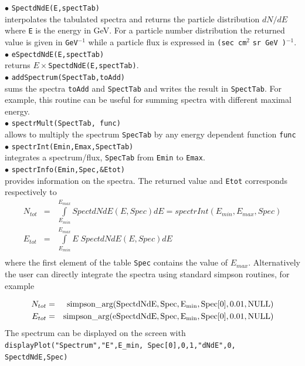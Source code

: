 \documentclass[12pt,a4paper]{article}
\begin{document}
\noindent
$\bullet$  \verb|SpectdNdE(E,spectTab)|\\
interpolates the tabulated spectra  and returns the 
particle distribution $dN/dE$  where \verb|E| is the energy  in GeV. 
For a particle number  distribution the returned value is given in \verb|GeV|$^{-1}$
while  a particle flux is expressed in \verb|(sec cm|$^2$ \verb|sr GeV )|$^{-1}$.\\


 
\noindent
$\bullet$ \verb|eSpectdNdE(E,spectTab)|\\
 returns $E\times$\verb|SpectdNdE(E,spectTab)|.\\

\noindent
$\bullet$ \verb|addSpectrum(SpectTab,toAdd)|\\
sums the  spectra \verb|toAdd|  and \verb|SpectTab| and writes the result in \verb|SpectTab|. For example, this routine can be useful for summing spectra 
with different  maximal energy.\\
\noindent
$\bullet$ \verb|spectrMult(SpectTab, func)|\\
allows to multiply the spectrum \verb|SpecTab| by any energy dependent function \verb|func|\\
\noindent
$\bullet$ \verb|spectrInt(Emin,Emax,SpectTab) | \\
integrates a spectrum/flux, \verb|SpecTab| from {\tt Emin} to  {\tt Emax}.\\
\noindent
$\bullet$ \verb|spectrInfo(Emin,Spec,&Etot)|\\
provides information on the spectra. The  returned value and \verb|Etot| corresponds respectively to   
\begin{eqnarray}
  N_{tot}&=&\int \limits_{E_{min}}^{E_{max}} SpectdNdE(E,Spec) dE = spectrInt(E_{min},E_{max},Spec) \\ 
  E_{tot}&=&  \int \limits_{E_{min}}^{E_{max}} E\; SpectdNdE(E,Spec)dE\\
  \nonumber
 \end{eqnarray}
where the first element of the table {\tt Spec} contains the value of   $E_{max}$.
Alternatively the user can directly integrate the spectra using standard simpson routines, for example

\begin{eqnarray}
  N_{tot}&=& {\rm simpson\_arg(SpectdNdE,Spec,E_{min},Spec[0],0.01,NULL)} \\ 
  E_{tot}&=&{\rm simpson\_arg(eSpectdNdE,Spec,E_{min},Spec[0],0.01,NULL)}
  \nonumber
 \end{eqnarray}
The spectrum can be displayed on the screen with \\
{\tt displayPlot("Spectrum","E",E\_min, Spec[0],0,1,"dNdE",0, SpectdNdE,Spec)}
\\
\end{document}
